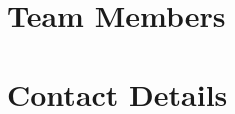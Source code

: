 \documentclass[../../main.tex]{subfiles}
\begin{document}
\section{Team Members}
\thispagestyle{fancy}

\section*{Contact Details}
\blindtext %
\end{document}
